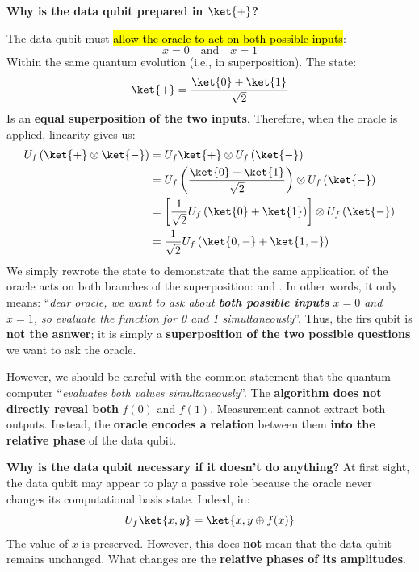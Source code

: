 \begin{flushleft}
    \textcolor{Green3}{ \textbf{Why is the data qubit prepared in $\ket{+}$?}}
\end{flushleft}
The data qubit must \hl{allow the oracle to act on both possible inputs}:
\begin{equation*}
    x = 0 \quad \text{and} \quad x = 1
\end{equation*}
Within the same quantum evolution (i.e., in superposition). The state:
\begin{equation*}
    \ket{+} = \frac{\ket{0} + \ket{1}}{\sqrt{2}}
\end{equation*}
Is an \textbf{equal superposition of the two inputs}. Therefore, when the oracle is applied, linearity gives us:
\begin{align*}
    U_f \left(\ket{+} \otimes \ket{-}\right) &= U_f \ket{+} \otimes U_f \left(\ket{-}\right) \\
    &= U_f \left(\frac{\ket{0} + \ket{1}}{\sqrt{2}}\right) \otimes U_f \left(\ket{-}\right) \\
    &= \left[\frac{1}{\sqrt{2}} U_f \left(\ket{0} + \ket{1}\right)\right] \otimes U_f \left(\ket{-}\right) \\
    &= \frac{1}{\sqrt{2}} U_f \left(\ket{0, -} + \ket{1, -}\right)
\end{align*}
We simply rewrote the state to demonstrate that the same application of the oracle acts on both branches of the superposition:  and . In other words, it only means: ``\emph{dear oracle, we want to ask about \textbf{both possible inputs} $x=0$ and $x=1$, so evaluate the function for 0 and 1 simultaneously}''. Thus, the firs qubit is \textbf{not the asnwer}; it is simply a \textbf{superposition of the two possible questions} we want to ask the oracle.

\highspace
However, we should be careful with the common statement that the quantum computer ``\emph{evaluates both values simultaneously}''. The \textbf{algorithm does not directly reveal both} $f(0)$ and $f(1)$. Measurement cannot extract both outputs. Instead, the \textbf{oracle encodes a relation} between them \textbf{into the relative phase} of the data qubit.

\highspace
\textcolor{Green3}{ \textbf{Why is the data qubit necessary if it doesn't do anything?}} At first sight, the data qubit may appear to play a passive role because the oracle never changes its computational basis state. Indeed, in:
\begin{equation*}
    U_f \ket{x,y} = \ket{x, y \oplus f(x)}
\end{equation*}
The value of $x$ is preserved. However, this does \textbf{not} mean that the data qubit remains unchanged. What changes are the \textbf{relative phases of its amplitudes}.

